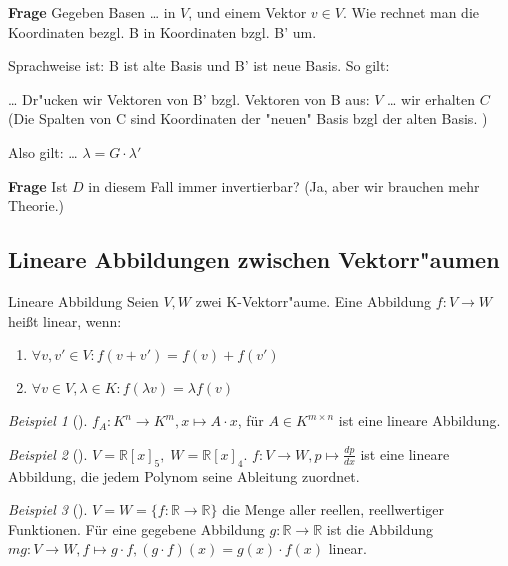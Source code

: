 \documentclass[11pt]{article}
\theoremstyle{remark}
\newtheorem{exa}{Beispiel}[section]
\theoremstyle{definition}
\theoremstyle{remark}
\begin{document}
\textbf{Frage} Gegeben Basen \ldots{} in \(V\), und einem Vektor \(v\in V\). Wie rechnet man die
Koordinaten bezgl. B in Koordinaten bzgl. B' um.

Sprachweise ist: B ist alte Basis und B' ist neue Basis.
So gilt:
\begin{relation}
\ldots{} Dr"ucken wir Vektoren von B' bzgl. Vektoren von B aus: \(V\) \ldots{}
wir erhalten \(C\) 
(Die Spalten von C sind Koordinaten der "neuen" Basis bzgl der alten Basis. )

Also gilt: \ldots{}
\(\lambda = G\cdot \lambda'\)
\end{relation}

\textbf{Frage} Ist \(D\) in diesem Fall immer invertierbar? (Ja, aber wir brauchen mehr Theorie.)

\subsection{Lineare Abbildungen zwischen Vektorr"aumen}
\label{sec:orgb4c03c4}
\begin{definition}{Lineare Abbildung}{}
Seien \(V, W\) zwei K-Vektorr"aume. Eine Abbildung \(f: V\rightarrow W\) heißt linear, wenn:

\begin{enumerate}
	\item \(\forall v,v' \in V: f(v+v')=f(v)+f(v')\)
	\item \(\forall v\in V, \lambda \in K: f(\lambda v)=\lambda f(v)\)
\end{enumerate}

\end{definition}

\begin{exa}[] \label{}
$f_{A}: K^n\rightarrow K^m, x\mapsto A\cdot x$, für $A \in K^{m\times n}$ ist eine lineare Abbildung.
\end{exa}

\begin{exa}[] \label{}
\(V=\mathbb{R}[x]_5,\;W=\mathbb{R}[x]_4\). $f: V\rightarrow W, p \mapsto \frac{dp}{dx}$ ist eine lineare Abbildung, die jedem Polynom seine Ableitung zuordnet.
\end{exa}

\begin{exa}[] \label{}
$V=W=\{f:\mathbb{R}\rightarrow\mathbb{R}\}$ die Menge aller reellen, reellwertiger Funktionen. Für eine gegebene Abbildung $g:\mathbb{R}\rightarrow\mathbb{R}$ ist die Abbildung $mg: V\rightarrow W, f\mapsto g\cdot f, (g\cdot f)(x)=g(x)\cdot f(x)$ linear.
\end{exa}
\end{document}

